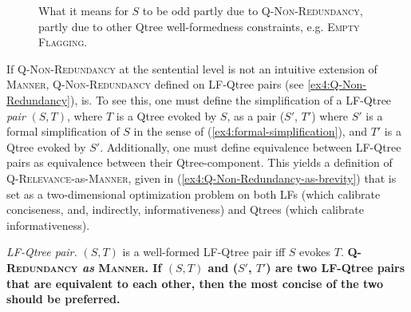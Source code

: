 \begin{figure}[H]
	\centering
	\caption[]{What it means for $S$ to be odd partly due to \textsc{Q-Non-Redundancy}, partly due to other Qtree well-formedness constraints, e.g. \textsc{Empty Flagging}.}\label{fig4:Q-Non-Redundancy-relevance}
\end{figure}



If \textsc{Q-Non-Redundancy} at the sentential level is not an intuitive extension of \textsc{Manner}, \textsc{Q-Non-Redundancy} defined on LF-Qtree pairs (see \ref{ex4:Q-Non-Redundancy}), is. To see this, one must define the simplification of a LF-Qtree \textit{pair} $(S, T)$, where $T$ is a Qtree evoked by $S$, as a pair ($S'$, $T'$) where $S'$ is a formal simplification of $S$ in the sense of (\ref{ex4:formal-simplification}), and $T'$ is a Qtree evoked by $S'$. Additionally, one must define equivalence between LF-Qtree pairs as equivalence between their Qtree-component. This yields a definition of \textsc{Q-Relevance}-as-\textsc{Manner}, given in (\ref{ex4:Q-Non-Redundancy-as-brevity}) that is set as a two-dimensional optimization problem on both LFs (which calibrate conciseness, and, indirectly, informativeness) and Qtrees (which calibrate informativeness).

\begin{exe}
	\ex 
	\begin{xlist}
		\ex \textit{LF-Qtree pair.} $(S, T)$ is a well-formed LF-Qtree pair iff $S$ evokes $T$.
		\ex \textbf{\textsc{Q-Redundancy}{\textit{ as} \textsc{Manner}}. If $(S, T)$ and ($S'$, $T'$) are two LF-Qtree pairs that are equivalent to each other, then the most concise of the two should be preferred.}
	\end{xlist}\label{ex4:Q-Non-Redundancy-as-brevity}
\end{exe}

